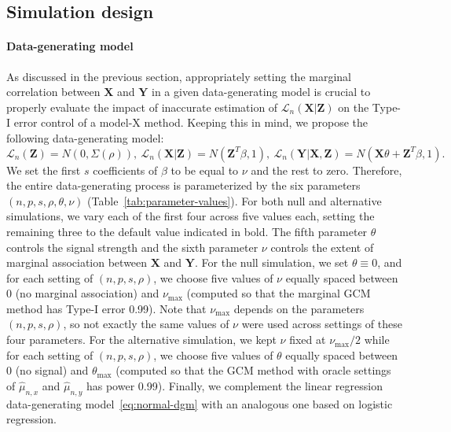 \documentclass[aos]{imsart}
\theoremstyle{plain}
\theoremstyle{remark}
\newcommand{\prx}{\bm X}								%
\newcommand{\prz}{\bm Z}								%
\newcommand{\pry}{{\bm Y}}								%
\newcommand{\law}{\mathcal L}							%
\begin{document}
\subsection{Simulation design} \label{sec:sim-design}

\paragraph*{Data-generating model} As discussed in the previous section, appropriately setting the marginal correlation between $\prx$ and $\pry$ in a given data-generating model is crucial to properly evaluate the impact of inaccurate estimation of $\law_n(\prx|\prz)$ on the Type-I error control of a model-X method. Keeping this in mind, we propose the following data-generating model:
\begin{equation}
    \law_n(\prz) = N(0, \Sigma(\rho)),\ \law_n(\prx | \prz) = N(\prz^T \beta, 1), \ \law_n(\pry|\prx,\prz) = N(\prx \theta + \prz^T \beta, 1).
    \label{eq:normal-dgm}
\end{equation}
We set the first $s$ coefficients of $\beta$ to be equal to $\nu$ and the rest to zero. Therefore, the entire data-generating process is parameterized by the six parameters $(n, p, s, \rho, \theta, \nu)$ (Table~\ref{tab:parameter-values}). For both null and alternative simulations, we vary each of the first four across five values each, setting the remaining three to the default value indicated in bold. The fifth parameter $\theta$ controls the signal strength and the sixth parameter $\nu$ controls the extent of marginal association between $\prx$ and $\pry$. For the null simulation, we set $\theta \equiv 0$, and for each setting of $(n, p, s, \rho)$, we choose five values of $\nu$ equally spaced between 0 (no marginal association) and $\nu_{\max}$ (computed so that the marginal GCM method has Type-I error 0.99). Note that $\nu_{\max}$ depends on the parameters $(n, p, s, \rho)$, so not exactly the same values of $\nu$ were used across settings of these four parameters. For the alternative simulation, we kept $\nu$ fixed at $\nu_{\max}/2$ while for each setting of $(n, p, s, \rho)$, we choose five values of $\theta$ equally spaced between 0 (no signal) and $\theta_{\max}$ (computed so that the GCM method with oracle settings of $\widehat \mu_{n,x}$ and $\widehat \mu_{n,y}$ has power 0.99). Finally, we complement the linear regression data-generating model~\eqref{eq:normal-dgm} with an analogous one based on logistic regression.
\end{document}
